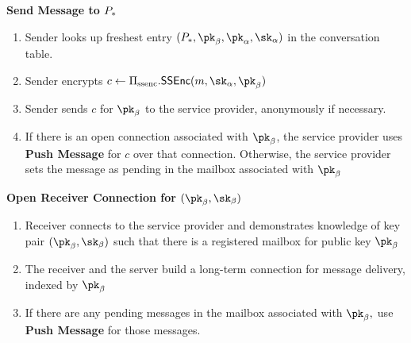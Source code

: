 \medskip \noindent
\textbf{Send Message to $P_*$}
\begin{enumerate}[noitemsep]
  \item Sender looks up freshest entry $(\personx, \pk_\beta,
  \pk_\alpha, \sk_\alpha)$
  in the conversation table.%

  \item Sender encrypts $c \leftarrow \sealedsenderencryptionscheme.\sealedsenderencryptionenc(m, \sk_\alpha, \pk_\beta)$


  \item Sender sends $c$ for $\pk_\beta$ to the service provider,
  anonymously if necessary.%
  \item If there is an open connection associated with $\pk_\beta$, the service provider uses \textbf{Push Message} for $c$ over that connection. Otherwise, the service provider sets the message as pending in the mailbox associated with $\pk_\beta$

\end{enumerate}

\medskip \noindent
\textbf{Open Receiver Connection for $(\pk_\beta,\sk_\beta)$}
\begin{enumerate}[noitemsep]
  \item Receiver connects to the service provider and demonstrates
  knowledge of key pair $(\pk_\beta,\sk_\beta)$ such that there is a registered mailbox for public key $\pk_\beta$
  \item The receiver and the server build a long-term connection for message delivery, indexed by $\pk_\beta$
  \item If there are any pending messages in the mailbox associated with $\pk_\beta,$ use \textbf{Push Message} for those messages.
\end{enumerate}

